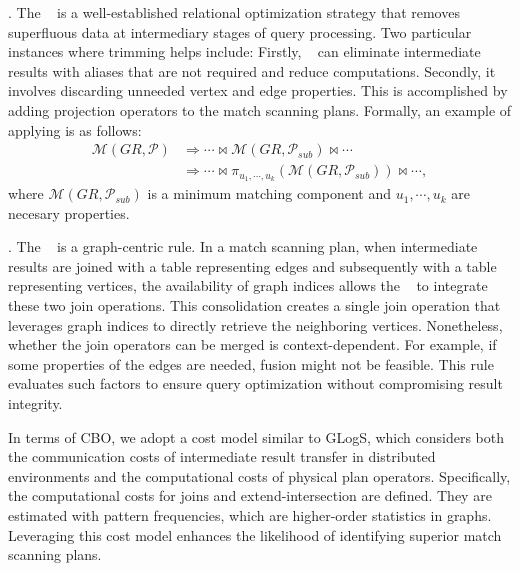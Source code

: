 \trimrule.
The \trimrule~ is a well-established relational optimization strategy that removes superfluous data at intermediary stages of query processing.
Two particular instances where trimming helps include:
Firstly, \trimrule~ can eliminate intermediate results with aliases that are not required and reduce computations.
Secondly, it involves discarding unneeded vertex and edge properties.
This is accomplished by adding projection operators to the match scanning plans.
Formally, an example of applying \trimrule is as follows:
\begin{equation}
    \begin{split}
        \mathcal{M}(GR, \mathcal{P}) & \Rightarrow \cdots \Join \mathcal{M}(GR, \mathcal{P}_{sub}) \Join \cdots \\
        & \Rightarrow \cdots \Join \pi_{u_1, \cdots, u_k}(\mathcal{M}(GR, \mathcal{P}_{sub})) \Join \cdots,
    \end{split}
\end{equation}
where $\mathcal{M}(GR, \mathcal{P}_{sub})$ is a minimum matching component and $u_1, \cdots, u_k$ are necesary properties.

\fusionrule.
The \fusionrule~ is a graph-centric rule.
In a match scanning plan, when intermediate results are joined with a table representing edges and subsequently with a table representing vertices, the availability of graph indices allows the \fusionrule~ to integrate these two join operations.
This consolidation creates a single join operation that leverages graph indices to directly retrieve the neighboring vertices.
Nonetheless, whether the join operators can be merged is context-dependent.
For example, if some properties of the edges are needed, fusion might not be feasible.
This rule evaluates such factors to ensure query optimization without compromising result integrity.



In terms of CBO, we adopt a cost model similar to GLogS, which considers both the communication costs of intermediate result transfer in distributed environments and the computational costs of physical plan operators.
Specifically, the computational costs for joins and extend-intersection are defined.
They are estimated with pattern frequencies, which are higher-order statistics in graphs.
Leveraging this cost model enhances the likelihood of identifying superior match scanning plans.
